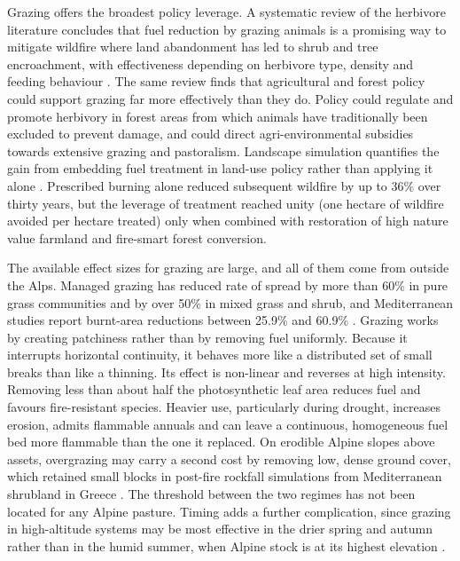 \documentclass[11pt,a4paper]{article}
\begin{document}
Grazing offers the broadest policy leverage. A systematic review of the herbivore literature concludes that fuel reduction by grazing animals is a promising way to mitigate wildfire where land abandonment has led to shrub and tree encroachment, with effectiveness depending on herbivore type, density and feeding behaviour \citep{rouetleduc_effects_2021}. The same review finds that agricultural and forest policy could support grazing far more effectively than they do. Policy could regulate and promote herbivory in forest areas from which animals have traditionally been excluded to prevent damage, and could direct agri-environmental subsidies towards extensive grazing and pastoralism. Landscape simulation quantifies the gain from embedding fuel treatment in land-use policy rather than applying it alone \citep{pais_optimizing_2023}. Prescribed burning alone reduced subsequent wildfire by up to 36\% over thirty years, but the leverage of treatment reached unity (one hectare of wildfire avoided per hectare treated) only when combined with restoration of high nature value farmland and fire-smart forest conversion.

The available effect sizes for grazing are large, and all of them come from outside the Alps. Managed grazing has reduced rate of spread by more than 60\% in pure grass communities and by over 50\% in mixed grass and shrub, and Mediterranean studies report burnt-area reductions between 25.9\% and 60.9\% \citep{xu_how_2026}. Grazing works by creating patchiness rather than by removing fuel uniformly. Because it interrupts horizontal continuity, it behaves more like a distributed set of small breaks than like a thinning. Its effect is non-linear and reverses at high intensity. Removing less than about half the photosynthetic leaf area reduces fuel and favours fire-resistant species. Heavier use, particularly during drought, increases erosion, admits flammable annuals and can leave a continuous, homogeneous fuel bed more flammable than the one it replaced. On erodible Alpine slopes above assets, overgrazing may carry a second cost by removing low, dense ground cover, which retained small blocks in post-fire rockfall simulations from Mediterranean shrubland in Greece \citep{asteriou_assessing_2025}. The threshold between the two regimes has not been located for any Alpine pasture. Timing adds a further complication, since grazing in high-altitude systems may be most effective in the drier spring and autumn rather than in the humid summer, when Alpine stock is at its highest elevation \citep{xu_how_2026}.
\end{document}
